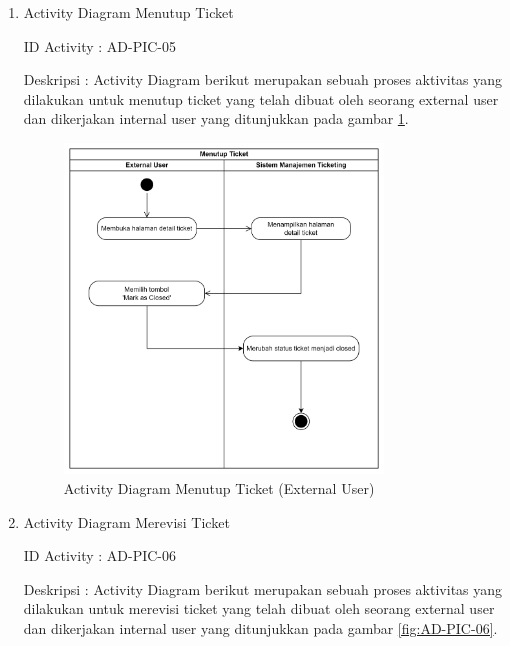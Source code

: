 \documentclass[12pt]{article}
\begin{document}
\begin{enumerate}[label=\textbf{4.\arabic*.}]
\begin{enumerate}[label=\textbf{4.1.\arabic*.}, wide, labelwidth=!, labelindent=0pt]
\begin{enumerate}[label=\textbf{4.1.7.\arabic*.}, wide, labelwidth=!, labelindent=0pt]
\begin{enumerate}[label=\arabic*.]
                \item Activity Diagram Menutup Ticket

                \noindent ID Activity	: AD-PIC-05

                \noindent Deskripsi	: Activity Diagram berikut merupakan sebuah proses aktivitas yang dilakukan untuk menutup ticket yang telah dibuat oleh seorang external user dan dikerjakan internal user yang ditunjukkan pada gambar \ref{fig:AD-PIC-05}.


                \begin{figure}[H]
                    \centering \includegraphics[width=0.8\textwidth]{images/activity/ex/Menutup Ticket.png}
                    \caption{Activity Diagram Menutup Ticket (External User)}
                    \label{fig:AD-PIC-05}
                \end{figure}

                \item Activity Diagram Merevisi Ticket

                \noindent ID Activity	: AD-PIC-06

                \noindent Deskripsi	: Activity Diagram berikut merupakan sebuah proses aktivitas yang dilakukan untuk merevisi ticket yang telah dibuat oleh seorang external user dan dikerjakan internal user yang ditunjukkan pada gambar \ref{fig:AD-PIC-06}.



\end{enumerate}
\end{enumerate}
\end{enumerate}
\end{enumerate}
\end{document}
